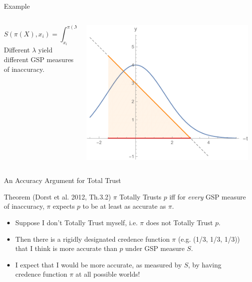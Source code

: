 \documentclass[aspectratio=169, dvipsnames]{beamer}
\begin{document}
\begin{frame}{Example}
  \begin{columns}
    \begin{column}{.4\linewidth}
      \begin{equation*}
        S(\pi(X), x_i) = \int_{x_i}^{\pi(X)}-(x_i - t)\lambda(dt)
      \end{equation*}
      Different $\lambda$ yield different GSP measures of inaccuracy.
    \end{column}
    \begin{column}{.58\linewidth}
      \begin{center}
      \includegraphics[width=1.05\textwidth]{GSP2.pdf}
      \end{center}
    \end{column}
  \end{columns}
\end{frame}

\begin{frame}{An Accuracy Argument for Total Trust}
  \begin{block}{Theorem (Dorst et al. 2012, Th.3.2)}
    $\pi$ Totally Trusts $p$ iff for \textit{every} GSP measure of inaccuracy, $\pi$ expects $p$ to be at least as accurate
    as $\pi$. 
  \end{block}
  \begin{itemize}
  \item Suppose I don't Totally Trust myself, i.e. $\pi$ does not Totally Trust $p$.
  \item Then there is a rigidly designated credence function $\pi$ (e.g. (1/3, 1/3, 1/3)) that I think is more accurate
    than $p$ under GSP measure $S$.
  \item I expect that I would be more accurate, as measured by $S$, by having credence function $\pi$ at all possible worlds!
  \end{itemize}
\end{frame}
\end{document}
